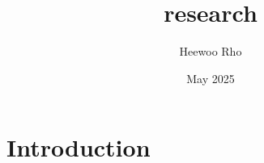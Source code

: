 \documentclass{article}
\title{research}
\author{Heewoo Rho}
\date{May 2025}
\begin{document}
\maketitle

\section{Introduction}
\end{document}
